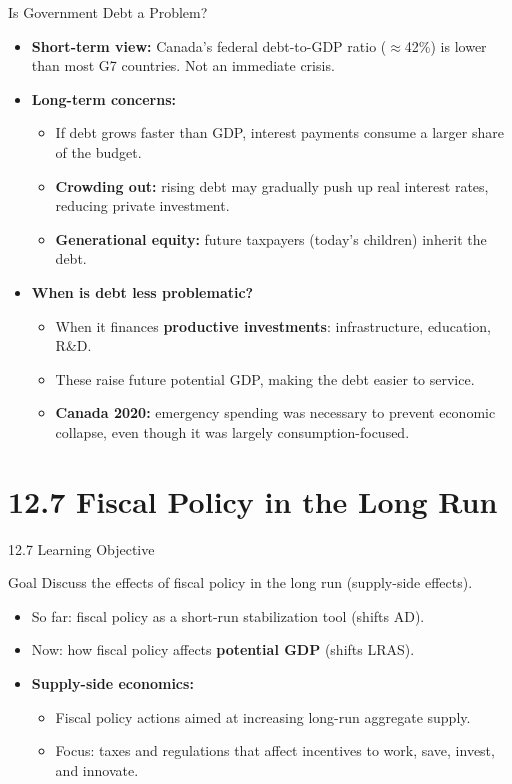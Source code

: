 \documentclass[aspectratio=169]{beamer}
\begin{document}
\begin{frame}{Is Government Debt a Problem?}
\transfade
\begin{itemize}[<+->]
  \item \textbf{Short-term view:} Canada's federal debt-to-GDP ratio ($\approx$42\%) is lower than most G7 countries. Not an immediate crisis.
  \item \textbf{Long-term concerns:}
  \begin{itemize}[<+->]
    \item If debt grows faster than GDP, interest payments consume a larger share of the budget.
    \item \textbf{Crowding out:} rising debt may gradually push up real interest rates, reducing private investment.
    \item \textbf{Generational equity:} future taxpayers (today's children) inherit the debt.
  \end{itemize}
  \item \textbf{When is debt less problematic?}
  \begin{itemize}[<+->]
    \item When it finances \textbf{productive investments}: infrastructure, education, R\&D.
    \item These raise future potential GDP, making the debt easier to service.
    \item \textbf{Canada 2020:} emergency spending was necessary to prevent economic collapse, even though it was largely consumption-focused.
  \end{itemize}
\end{itemize}
\end{frame}

\section{12.7 Fiscal Policy in the Long Run}

\begin{frame}{12.7 Learning Objective}
\transfade
\begin{block}{Goal}
Discuss the effects of fiscal policy in the long run (supply-side effects).
\end{block}
\begin{itemize}[<+->]
  \item So far: fiscal policy as a short-run stabilization tool (shifts AD).
  \item Now: how fiscal policy affects \textbf{potential GDP} (shifts LRAS).
  \item \textbf{Supply-side economics:}
  \begin{itemize}[<+->]
    \item Fiscal policy actions aimed at increasing long-run aggregate supply.
    \item Focus: taxes and regulations that affect incentives to work, save, invest, and innovate.
  \end{itemize}
\end{itemize}
\end{frame}
\end{document}

